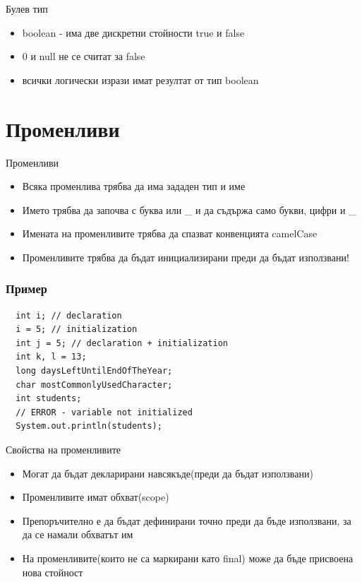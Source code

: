 \documentclass{beamer}
\begin{document}
\begin{frame}{Булев тип}
  \transdissolve
  \begin{itemize}
  \item boolean - има две дискретни стойности true и false \pause
  \item 0 и null не се считат за false \pause
  \item всички логически изрази имат резултат от тип boolean \pause
  \end{itemize}
\end{frame}

\section{Променливи}
\begin{frame}{Променливи}
  \transdissolve
  \begin{itemize}
  \item Всяка променлива трябва да има
    зададен тип и име \pause
  \item Името трябва да започва с буква или \_
    и да съдържа само букви, цифри и \_ \pause
  \item Имената на променливите трябва да спазват конвенцията
    camelCase \pause
  \item Променливите трябва да бъдат инициализирани преди да бъдат използвани!
  \end{itemize}
\end{frame}

\begin{frame}[fragile]
  \frametitle{Пример}
  \transdissolve
\begin{lstlisting}
  int i; // declaration
  i = 5; // initialization
  int j = 5; // declaration + initialization
  int k, l = 13;
  long daysLeftUntilEndOfTheYear;
  char mostCommonlyUsedCharacter;
  int students;
  // ERROR - variable not initialized
  System.out.println(students);
\end{lstlisting}
\end{frame}

\begin{frame}{Свойства на променливите}
  \transdissolve
  \begin{itemize}
  \item Могат да бъдат декларирани навсякъде(преди да бъдат
    използвани) \pause
  \item Променливите имат обхват(scope) \pause
  \item Препоръчително е да бъдат дефинирани точно преди да бъде
    използвани, за да се намали обхватът им \pause
  \item На променливите(които не са маркирани като final) може да бъде
    присвоена нова стойност
  \end{itemize}
\end{frame}
\end{document}
